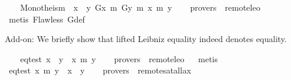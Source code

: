 \begin{isabellebody}
\isamarkuptrue%
\ \ \isamarkupfalse%
\ Monotheism{\isacharcolon}\ {\isachardoublequoteopen}{\isacharbrackleft}{\isasymforall}\ {\isacharparenleft}{\isasymlambda}x{\isachardot}\ {\isasymforall}\ {\isacharparenleft}{\isasymlambda}y{\isachardot}\ {\isacharparenleft}G{\isacharparenleft}x{\isacharparenright}\ m{\isasymRightarrow}\ {\isacharparenleft}G{\isacharparenleft}y{\isacharparenright}\ m{\isasymRightarrow}\ {\isacharparenleft}x\ m{\isacharequal}\ y{\isacharparenright}{\isacharparenright}{\isacharparenright}{\isacharparenright}{\isacharparenright}{\isacharbrackright}{\isachardoublequoteclose}\isanewline
\ \ \isamarkupfalse%
\ {\isacharbrackleft}provers\ {\isacharequal}\ remote{\isacharunderscore}leo{}{\isacharbrackright}%
\isadelimproof
\ %
\endisadelimproof
%
\isatagproof
{}\isamarkupfalse%
\ {\isacharparenleft}metis\ Flawless\ G{\isacharunderscore}def{\isacharparenright}%
\endisatagproof
{\isafoldproof}%
%
\isadelimproof
%
\endisadelimproof
%
\begin{isamarkuptext}%
Add-on: We briefly show that lifted Leibniz equality indeed denotes equality.%
\end{isamarkuptext}%
\isamarkuptrue%
\ \ \isamarkupfalse%
\ eqtest{}{\isacharcolon}\ {\isachardoublequoteopen}x\ {\isacharequal}\ y\ {\isasymLongrightarrow}\ {\isacharbrackleft}x\ m{\isacharequal}\ y{\isacharbrackright}{\isachardoublequoteclose}\isanewline
\ \ \isamarkupfalse%
\ {\isacharbrackleft}provers\ {\isacharequal}\ remote{\isacharunderscore}leo{}{\isacharbrackright}%
\isadelimproof
\ %
\endisadelimproof
%
\isatagproof
{}\isamarkupfalse%
\ metis%
\endisatagproof
{\isafoldproof}%
%
\isadelimproof
%
\endisadelimproof
\ \isanewline
\ \ \ \ \isanewline
\ \ \isamarkupfalse%
\ eqtest{}{\isacharcolon}\ {\isachardoublequoteopen}{\isacharbrackleft}x\ m{\isacharequal}\ y{\isacharbrackright}\ {\isasymLongrightarrow}\ x\ {\isacharequal}\ y{\isachardoublequoteclose}\isanewline
\ \ \isamarkupfalse%
\ {\isacharbrackleft}provers\ {\isacharequal}\ remote{\isacharunderscore}satallax{\isacharbrackright}%
\isadelimproof
\ %
\endisadelimproof
%
\isatagproof
{}\isamarkupfalse%
\isanewline
\isanewline
%
\endisatagproof
{\isafoldproof}%
%
\isadelimproof
%
\endisadelimproof
%
\isadelimtheory
%
\endisadelimtheory
%
\isatagtheory
%
\endisatagtheory
{\isafoldtheory}%
%
\isadelimtheory
%
\endisadelimtheory
\ \end{isabellebody}%
